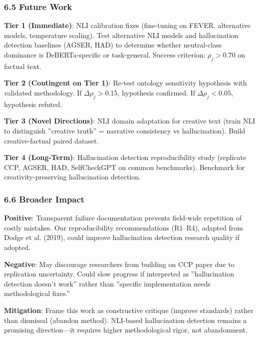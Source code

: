 \subsubsection{6.5 Future Work}

\textbf{Tier 1 (Immediate)}: NLI calibration fixes (fine-tuning on FEVER, alternative models, temperature scaling). Test alternative NLI models and hallucination detection baselines (AGSER, HAD) to determine whether neutral-class dominance is DeBERTa-specific or task-general. Success criterion: $\rho_j > 0.70$ on factual text.

\textbf{Tier 2 (Contingent on Tier 1)}: Re-test ontology sensitivity hypothesis with validated methodology. If $\Delta\rho_j > 0.15$, hypothesis confirmed. If $\Delta\rho_j < 0.05$, hypothesis refuted.

\textbf{Tier 3 (Novel Directions)}: NLI domain adaptation for creative text (train NLI to distinguish ''creative truth'' = narrative consistency vs hallucination). Build creative-factual paired dataset.

\textbf{Tier 4 (Long-Term)}: Hallucination detection reproducibility study (replicate CCP, AGSER, HAD, SelfCheckGPT on common benchmarks). Benchmark for creativity-preserving hallucination detection.

\subsubsection{6.6 Broader Impact}

\textbf{Positive}: Transparent failure documentation prevents field-wide repetition of costly mistakes. Our reproducibility recommendations (R1--R4), adapted from Dodge et al. (2019), could improve hallucination detection research quality if adopted.

\textbf{Negative}: May discourage researchers from building on CCP paper due to replication uncertainty. Could slow progress if interpreted as ''hallucination detection doesn't work'' rather than ''specific implementation needs methodological fixes.''

\textbf{Mitigation}: Frame this work as constructive critique (improve standards) rather than dismissal (abandon method). NLI-based hallucination detection remains a promising direction---it requires higher methodological rigor, not abandonment.
